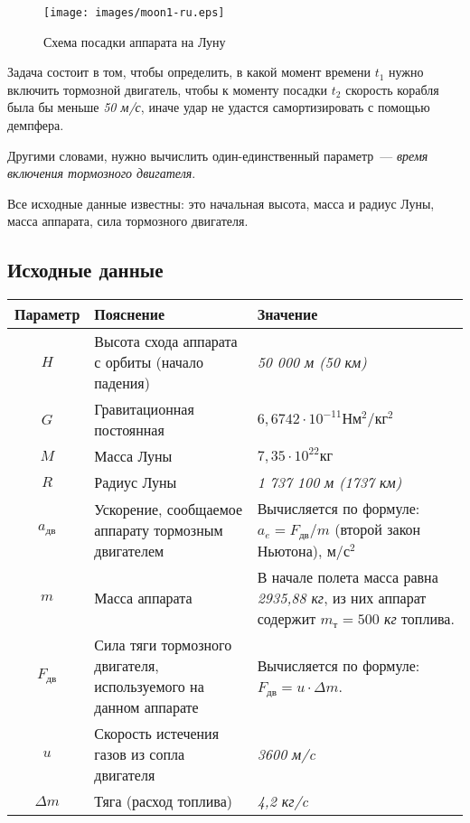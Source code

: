 \documentclass[12pt,a4paper]{article}
\begin{document}
\begin{figure}[tbh]
  \begin{center}
    \texttt{[image: images/moon1-ru.eps]}
    \caption{Схема посадки аппарата на Луну}
    \label{Pic:moon1}
  \end{center}
\end{figure}

Задача состоит в том, чтобы определить, в какой момент времени $ t_1 $ нужно включить
тормозной двигатель, чтобы к моменту посадки $ t_2 $ скорость корабля была бы меньше \emph{50
м/с}, иначе удар не удастся самортизировать с помощью демпфера.

Другими словами, нужно вычислить один-единственный параметр~--- \emph{время включения
  тормозного двигателя}.

Все исходные данные известны: это начальная высота, масса и радиус Луны, масса аппарата,
сила тормозного двигателя.

\subsection{Исходные данные}

\begin{center}
\begin{tabular}{ |c|p{6cm}|p{6cm}| } 
  \hline
  \textbf{Параметр} & \textbf{Пояснение} & \textbf{Значение} \\
  \hline
  $ H $ & Высота схода аппарата с орбиты (начало падения) & \emph{50 000 м (50 км)} \\
  \hline
  $ G $ & Гравитационная постоянная & $ 6,6742 \cdot 10^{-11} \text{Н} \text{м}^{2}/\text{кг}^{2} $ \\
  \hline
  $ M $ & Масса Луны & $7,35 \cdot 10^{22} \text{кг}$ \\
  \hline
  $ R $ & Радиус Луны & \emph{1 737 100 м (1737 км)} \\
  \hline
  $ a_{\text{дв}} $ & Ускорение, сообщаемое аппарату тормозным двигателем & Вычисляется по формуле:
  $ a_{e} = F_{\text{дв}} / m $ (второй закон Ньютона), $ \text{м}/\text{с}^2 $ \\
  \hline  
  $ m $ & Масса аппарата & В начале полета масса равна \emph{2935,88 кг}, из них аппарат
  содержит $m_{\text{т}} = 500 $ \emph{кг} топлива.\\
  \hline
  $ F_{\text{дв}} $ & Сила тяги тормозного двигателя, используемого на данном аппарате &
  Вычисляется по формуле: $ F_{\text{дв}} = u \cdot \Delta m$.\\
  \hline
  $ u $ & Скорость истечения газов из сопла двигателя & \emph{3600 м/c}\\
  \hline
  $ \Delta m $ & Тяга (расход топлива) & \emph{4,2 кг/c}\\
  \hline
\end{tabular}
\end{center}
\end{document}
